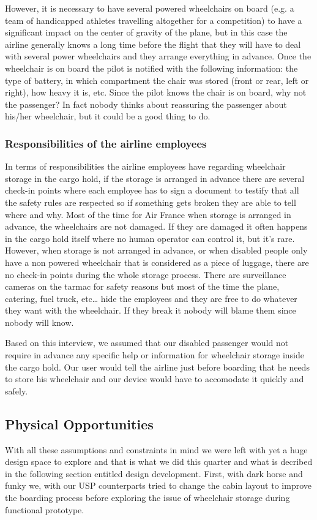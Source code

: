 However, it is necessary to have several powered wheelchairs on board (e.g. a team of handicapped athletes travelling altogether for a competition) to have a significant impact on the center of gravity of the plane, but in this case the airline generally knows a long time before the flight that they will have to deal with several power wheelchairs and they arrange everything in advance.
Once the wheelchair is on board the pilot is notified with the following information: the type of battery, in which compartment the chair was stored (front or rear, left or right), how heavy it is, etc. Since the pilot knows the chair is on board, why not the passenger? In fact nobody thinks about reassuring the passenger about his/her wheelchair, but it could be a good thing to do.

\subsubsection*{Responsibilities of the airline employees}
In terms of responsibilities the airline employees have regarding wheelchair storage in the cargo hold, if the storage is arranged in advance there are several check-in points where each employee has to sign a document to testify that all the safety rules are respected so if something gets broken they are able to tell where and why. Most of the time for Air France when storage is arranged in advance, the wheelchairs are not damaged. If they are damaged it often happens in the cargo hold itself where no human operator can control it, but it’s rare. 
However, when storage is not arranged in advance, or when disabled people only have a non powered wheelchair that is considered as a piece of luggage, there are no check-in points during the whole storage process. There are surveillance cameras on the tarmac for safety reasons but most of the time the plane, catering, fuel truck, etc… hide the employees and they are free to do whatever they want with the wheelchair. If they break it nobody will blame them since nobody will know.

Based on this interview, we assumed that our disabled passenger would not require in advance any specific help or information for wheelchair storage inside the cargo hold. Our user would tell the airline just before boarding that he needs to store his wheelchair and our device would have to accomodate it quickly and safely.


\subsection{Physical Opportunities}

With all these assumptions and constraints in mind we were left with yet a huge design space to explore and that is what we did this quarter and what is decribed in the following section entitled design development. First, with dark horse and funky we, with our USP counterparts tried to change the cabin layout to improve the boarding process before exploring the issue of wheelchair storage during functional prototype.
